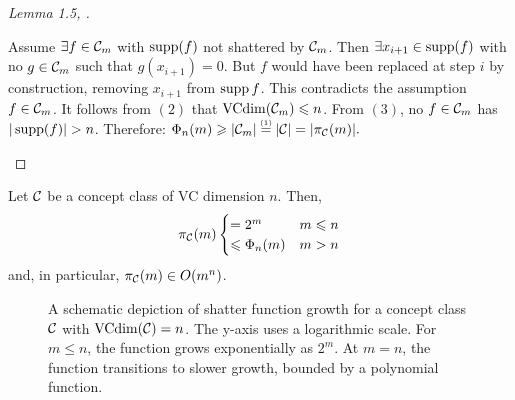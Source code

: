 \begin{proof}[Lemma 1.5, \cite{Chernikov}]
\begin{outline}
        \2[(3)] Assume $\exists f\in\mathcal{C}_m$ with $\operatorname{supp}(f)$ not shattered by $\mathcal{C}_m$. Then $\exists x_{i+1}\in\operatorname{supp}(f)$ with no $g\in\mathcal{C}_m$ such that $g(x_{i+1})=0$. But $f$ would have been replaced at step $i$ by construction, removing $x_{i+1}$ from $\operatorname{supp} f$. This contradicts the assumption $f\in\mathcal{C}_m$.
\0 It follows from $(2)$ that $\operatorname{VCdim}(\mathcal{C}_m) \leqslant n$. From $(3)$, no $f\in\mathcal{C}_m$ has $|\supp(f)|>n$. Therefore: 
$\Phi_n(m) \geq |\C_m| \mathrel{\overset{\makebox[0pt]{\mbox{\normalfont\tiny\sffamily $(1)$}}}{=}} 
    |\C| = |\shatterfunc(m)|.$
\end{outline}
\end{proof}

\begin{corollary}
\label{cor:shatterfuncGrowth}
Let $\mathcal{C}$ be a concept class of VC dimension $n$. Then,
$$
\pi_{\mathcal{C}}(m)
\begin{cases}
    = 2^m & m \leqslant n \\
    \leqslant \Phi_n(m) & m > n
\end{cases}
$$
and, in particular, $\pi_{\mathcal{C}}(m)\in O(m^n)$.
\end{corollary}

\begin{figure}
    \centering
    \caption{A schematic depiction of shatter function growth for a concept class $\mathcal{C}$ with $\operatorname{VCdim}(\mathcal{C})=n$. The y-axis uses a logarithmic scale. For $m \leq n$, the function grows exponentially as $2^m$. At $m = n$, the function transitions to slower growth, bounded by a polynomial function.}
    \label{fig:enter-label}
\end{figure}

